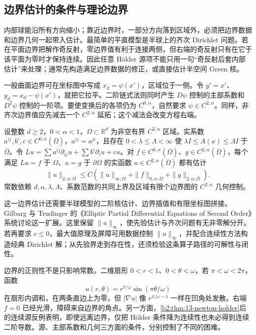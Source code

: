 \subsection{边界估计的条件与理论边界}
\label{b2:subsec:160504}

内部球能沿所有方向缩小；靠近边界时，一部分方向落到区域外，必须把边界数据和边界几何一起带入估计。最简单的平直模型是半球上的齐次 Dirichlet 问题。若在平面边界把解作奇反射，零边界值有利于连接两侧，但右端的奇反射只有在它于该平面为零时才保持连续。因此任意 Hölder 源项不能只用一句“奇反射后套内部估计”来处理；通常先构造满足边界数据的修正，或直接估计半空间 Green 核。

\ProseParagraphBreak
一般曲面边界可在坐标图中写成 \(x_d=\psi(x')\)，区域位于一侧。令 \(y'=x'\)、\(y_d=x_d-\psi(x')\)，就把它拉平。二阶链式法则同时产生 \(D\psi\) 控制的主部系数和 \(D^2\psi\) 控制的一阶项。要使变换后的各项仍为 \(C^{0,\alpha}\)，自然要求 \(\psi\in C^{2,\alpha}\)。同样，非齐次边界值应先减去一个 \(C^{2,\alpha}\) 延拓；这个减法会改变方程右端。

\begin{claim}
\label{b2:claim:18-boundary-schauder}
设整数 \(d\ge2\)，\(0<\alpha<1\)，\(\Omega\subset\mathbb R^d\) 为非空有界 \(C^{2,\alpha}\) 区域。实系数 \(a^{ij},b^i,c\in C^{0,\alpha}(\overline\Omega)\)，\(a^{ij}=a^{ji}\)，且存在 \(0<\lambda\le\Lambda<\infty\) 使 \(\lambda I\le A(x)\le\Lambda I\) 于 \(\overline\Omega\)。令
\(Lu=\sum a^{ij}\partial_{ij}u+\sum b^i\partial_i u+cu\)。对 \(f\in C^{0,\alpha}(\overline\Omega)\)、\(g\in C^{2,\alpha}(\overline\Omega)\)，每个满足 \(Lu=f\) 于 \(\Omega\)、\(u=g\) 于 \(\partial\Omega\) 的实函数 \(u\in C^{2,\alpha}(\overline\Omega)\) 都有估计
\[
 \|u\|_{2,\alpha;\overline\Omega}
 \le C\left(\|u\|_{\infty;\Omega}
 +\|f\|_{0,\alpha;\overline\Omega}
 +\|g\|_{2,\alpha;\overline\Omega}\right).
\]
常数依赖 \(d,\alpha,\lambda,\Lambda\)、系数范数的共同上界及区域有限个边界图的 \(C^{2,\alpha}\) 几何控制。
\end{claim}

这一边界估计还需要半球模型的二阶核估计、边界插值和有限坐标图拼接。Gilbarg 与 Trudinger 的《Elliptic Partial Differential Equations of Second Order》\cite[Chapter 6]{Gilbarg2001Elliptic}系统讨论这一扩展。这里保留 \(\|u\|_\infty\)，使先验估计与齐次问题有无非零解分开。若再要求 \(c\le0\)，最大值原理及屏障可用数据控制 \(\|u\|_\infty\)，并配合连续性方法构造经典 Dirichlet 解；从先验界走到存在性，还须检验这条算子路径的可解性与闭性。

\ProseParagraphBreak
边界的正则性不是只影响常数。二维扇形 \(0<r<1\)、\(0<\theta<\omega\)，若 \(\pi<\omega<2\pi\)，函数
\[
 u(r,\theta)=r^{\pi/\omega}\sin(\pi\theta/\omega)
\]
在扇形内调和，在两条直边上为零，但 \(|\nabla u|\) 像 \(r^{\pi/\omega-1}\) 一样在凹角处发散。右端 \(f=0\) 已经光滑，障碍来自边界的角点。另一方面，\cref{b2:thm:13-newton-holder}后的连续源反例表明，即使远离边界，仅把 Hölder 条件降为连续性也未必得到连续二阶导数。源、主部系数和几何三方面的条件，分别控制了不同的困难。

